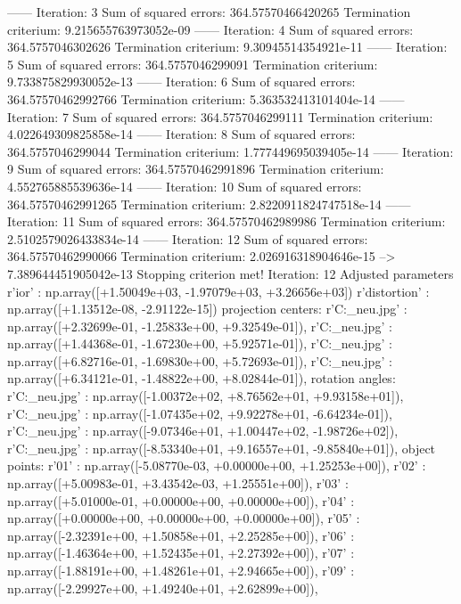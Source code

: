 ------ Iteration: 3
Sum of squared errors: 364.57570466420265
Termination criterium: 9.215655763973052e-09
------ Iteration: 4
Sum of squared errors: 364.5757046302626
Termination criterium: 9.30945514354921e-11
------ Iteration: 5
Sum of squared errors: 364.5757046299091
Termination criterium: 9.733875829930052e-13
------ Iteration: 6
Sum of squared errors: 364.57570462992766
Termination criterium: 5.363532413101404e-14
------ Iteration: 7
Sum of squared errors: 364.5757046299111
Termination criterium: 4.022649309825858e-14
------ Iteration: 8
Sum of squared errors: 364.5757046299044
Termination criterium: 1.777449695039405e-14
------ Iteration: 9
Sum of squared errors: 364.57570462991896
Termination criterium: 4.552765885539636e-14
------ Iteration: 10
Sum of squared errors: 364.57570462991265
Termination criterium: 2.8220911824747518e-14
------ Iteration: 11
Sum of squared errors: 364.57570462989986
Termination criterium: 2.5102579026433834e-14
------ Iteration: 12
Sum of squared errors: 364.57570462990066
Termination criterium: 2.026916318904646e-15
-->
7.389644451905042e-13
Stopping criterion met! Iteration: 12
Adjusted parameters
r'ior' : np.array([+1.50049e+03, -1.97079e+03, +3.26656e+03])
r'distortion' : np.array([+1.13512e-08, -2.91122e-15])
projection centers:
r'C:\Users\Clemens\Desktop\fotos_neu\1.jpg' : np.array([+2.32699e-01, -1.25833e+00, +9.32549e-01]),
r'C:\Users\Clemens\Desktop\fotos_neu\2.jpg' : np.array([+1.44368e-01, -1.67230e+00, +5.92571e-01]),
r'C:\Users\Clemens\Desktop\fotos_neu\3.jpg' : np.array([+6.82716e-01, -1.69830e+00, +5.72693e-01]),
r'C:\Users\Clemens\Desktop\fotos_neu\4.jpg' : np.array([+6.34121e-01, -1.48822e+00, +8.02844e-01]),
rotation angles:
r'C:\Users\Clemens\Desktop\fotos_neu\1.jpg' : np.array([-1.00372e+02, +8.76562e+01, +9.93158e+01]),
r'C:\Users\Clemens\Desktop\fotos_neu\2.jpg' : np.array([-1.07435e+02, +9.92278e+01, -6.64234e-01]),
r'C:\Users\Clemens\Desktop\fotos_neu\3.jpg' : np.array([-9.07346e+01, +1.00447e+02, -1.98726e+02]),
r'C:\Users\Clemens\Desktop\fotos_neu\4.jpg' : np.array([-8.53340e+01, +9.16557e+01, -9.85840e+01]),
object points:
r'01' : np.array([-5.08770e-03, +0.00000e+00, +1.25253e+00]),
r'02' : np.array([+5.00983e-01, +3.43542e-03, +1.25551e+00]),
r'03' : np.array([+5.01000e-01, +0.00000e+00, +0.00000e+00]),
r'04' : np.array([+0.00000e+00, +0.00000e+00, +0.00000e+00]),
r'05' : np.array([-2.32391e+00, +1.50858e+01, +2.25285e+00]),
r'06' : np.array([-1.46364e+00, +1.52435e+01, +2.27392e+00]),
r'07' : np.array([-1.88191e+00, +1.48261e+01, +2.94665e+00]),
r'09' : np.array([-2.29927e+00, +1.49240e+01, +2.62899e+00]),

